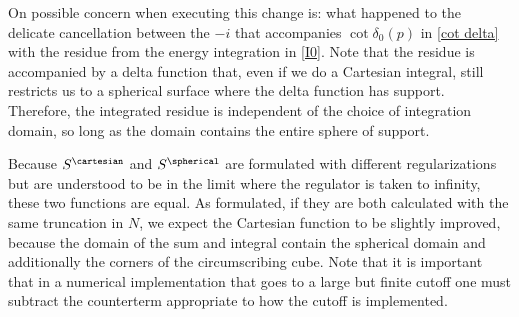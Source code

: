 On possible concern when executing this change is: what happened to the delicate cancellation between the $-i$ that accompanies $\cot\delta_0(p)$ in \eqref{cot delta} with the residue from the energy integration in \eqref{I0}.
Note that the residue is accompanied by a delta function that, even if we do a Cartesian integral, still restricts us to a spherical surface where the delta function has support.
Therefore, the integrated residue is independent of the choice of integration domain, so long as the domain contains the entire sphere of support.

Because $S^{\cartesian}$ and $S^{\spherical}$ are formulated with different regularizations but are understood to be in the limit where the regulator is taken to infinity, these two functions are equal.
As formulated, if they are both calculated with the same truncation in $N$, we expect the Cartesian function to be slightly improved, because the domain of the sum and integral contain the spherical domain and additionally the corners of the circumscribing cube.
Note that it is important that in a numerical implementation that goes to a large but finite cutoff one must subtract the counterterm appropriate to how the cutoff is implemented.
